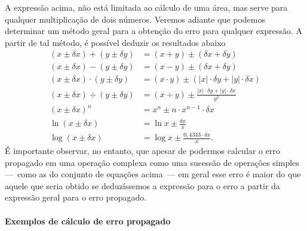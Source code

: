 A expressão acima, não está limitada ao cálculo de uma área, mas serve para qualquer multiplicação de dois números. Veremos adiante que podemos determinar um método geral para a obtenção do erro para qualquer expressão. A partir de tal método, é possível deduzir os resultados abaixo
\begin{subequations}
\begin{align}
	(x\pm\delta x)+(y\pm\delta y) &= (x+y)\pm(\delta x+\delta y) \label{Eq:ErroOpBasica:soma}\\
	(x\pm\delta x)-(y\pm\delta y) &= (x-y)\pm(\delta x + \delta y) \label{Eq:ErroOpBasica:subtracao} \\
	(x\pm\delta x) \cdot (y\pm\delta y) &= (x\cdot y)\pm (|x|\cdot\delta y + |y|\cdot\delta x) \label{Eq:ErroOpBasica:mult} \\
	(x\pm \delta x)\div(y\pm\delta y) &= (x\div y)\pm\frac{|x|\cdot\delta y+|y|\cdot\delta x}{y^2} \label{Eq:ErroOpBasica:div} \\
	(x\pm\delta x)^n &= x^n\pm n \cdot x^{n-1}\cdot\delta x \label{Eq:ErroOpBasica:pot} \\
	\ln(x\pm\delta x) &= \ln x \pm \frac{\delta x}{x} \\
	\log (x\pm\delta x) &= \log x \pm \frac{0,4343\cdot\delta x}{x}.
\end{align}
\end{subequations}
%
É importante observar, no entanto, que apesar de podermos calcular o erro propagado em uma operação complexa como uma sucessão de operações simples ---~como as do conjunto de equações acima~--- em geral esse erro é maior do que aquele que seria obtido se deduzíssemos a expressão para o erro a partir da expressão geral para o erro propagado.

\paragraph{Exemplos de cálculo de erro propagado}

